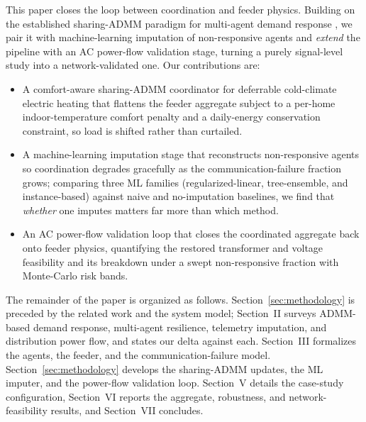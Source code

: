 This paper closes the loop between coordination and feeder physics. Building on the
established sharing-ADMM paradigm for multi-agent demand response
\cite{boyd2011admm,Nguyen2018}, we pair it with machine-learning imputation of
non-responsive agents and \emph{extend} the pipeline with an AC power-flow
validation stage, turning a purely signal-level study into a network-validated one.
Our contributions are:

\begin{itemize}
  \item A comfort-aware sharing-ADMM coordinator for deferrable cold-climate
  electric heating that flattens the feeder aggregate subject to a per-home
  indoor-temperature comfort penalty and a daily-energy conservation constraint,
  so load is shifted rather than curtailed.
  \item A machine-learning imputation stage that reconstructs non-responsive agents
  so coordination degrades gracefully as the communication-failure fraction grows;
  comparing three ML families (regularized-linear, tree-ensemble, and
  instance-based) against naive and no-imputation baselines, we find that
  \emph{whether} one imputes matters far more than which method.
  \item An AC power-flow validation loop that closes the coordinated aggregate back
  onto feeder physics, quantifying the restored transformer and voltage feasibility
  and its breakdown under a swept non-responsive fraction with Monte-Carlo risk
  bands.
\end{itemize}

The remainder of the paper is organized as follows.
Section~\ref{sec:methodology} is preceded by the related work and the system
model; Section~II surveys ADMM-based demand response, multi-agent resilience,
telemetry imputation, and distribution power flow, and states our delta against
each. Section~III formalizes the agents, the feeder, and the
communication-failure model. Section~\ref{sec:methodology} develops the
sharing-ADMM updates, the ML imputer, and the power-flow validation loop.
Section~V details the case-study configuration, Section~VI reports the aggregate,
robustness, and network-feasibility results, and Section~VII concludes.
